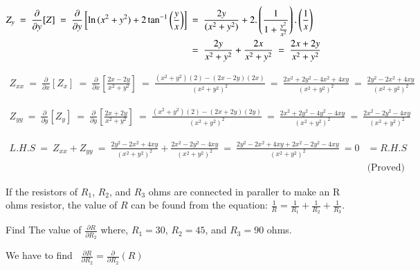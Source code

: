 \documentclass[12pt]{article}
\begin{document}
\vspace{3ex}
$\begin{aligned}
Z_y
\ = \ \frac{\partial}{\partial{y}}[Z]
\ = \ \frac{\partial}{\partial{y}}\left[\ln{(x^2+y^2)+2\tan^{-1}{\left(\frac{y}{x}\right)}}\right]
\ &= \ \frac{2y}{(x^2+y^2)} + 2.\left(\frac{1}{1+\scalebox{1}{$\frac{y^2}{x^2}$}}\right).\left(\frac{1}{x}\right)\\
\ &= \ \frac{2y}{x^2+y^2} + \frac{2x}{x^2+y^2}
\ = \ \frac{2x+2y}{x^2+y^2}
\end{aligned}$

\vspace{3ex}
$\begin{aligned}
Z_{xx}
\ = \ \frac{\partial}{\partial{x}}[Z_x]
\ = \ \frac{\partial}{\partial{x}}\left[\frac{2x-2y}{x^2+y^2}\right]
\ = \ \frac{(x^2+y^2)(2)-(2x-2y)(2x)}{(x^2+y^2)^2}
\ = \ \frac{2x^2+2y^2-4x^2+4xy}{(x^2+y^2)^2}
\ = \ \frac{2y^2-2x^2+4xy}{(x^2+y^2)^2}
\end{aligned}$

\vspace{3ex}
$\begin{aligned}
Z_{yy}
\ = \ \frac{\partial}{\partial{y}}[Z_y]
\ = \ \frac{\partial}{\partial{y}}\left[\frac{2x+2y}{x^2+y^2}\right]
\ = \ \frac{(x^2+y^2)(2)-(2x+2y)(2y)}{(x^2+y^2)^2}
\ = \ \frac{2x^2+2y^2-4y^2-4xy}{(x^2+y^2)^2}
\ = \ \frac{2x^2-2y^2-4xy}{(x^2+y^2)^2}
\end{aligned}$

\vspace{5ex}
$\begin{aligned}
   L.H.S \ = \ Z_{xx} + Z_{yy}
   \ = \ \frac{2y^2-2x^2+4xy}{(x^2+y^2)^2}
   + \frac{2x^2-2y^2-4xy}{(x^2+y^2)^2}
   \ = \ \frac{2y^2-2x^2+4xy+2x^2-2y^2-4xy}{(x^2+y^2)^2}
   \ = 0 &= R.H.S\\[-2ex]
   & \text{(Proved)}
\end{aligned}$

\pagebreak
\textbf{} If the resistors of $R_1$, $R_2$, and $R_3$ ohms are connected in paraller to make an R ohms resistor, the value of $R$ can be found from the equation: $\frac{1}{R} = \frac{1}{R_1}+\frac{1}{R_2}+\frac{1}{R_3}$. 

Find The value of $\frac{\partial{R}}{\partial{R_2}}$
where, $R_1=30$, $R_2=45$, and $R_3=90$ ohms.

We have to find \ $\frac{\partial{R}}{\partial{R_2}} = \frac{\partial}{\partial{R_2}}(R)$
\end{document}
